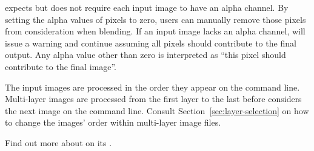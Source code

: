 \App{} expects but does not require each input image to have an alpha
channel.
By setting the alpha values of pixels to zero, users can manually
remove those pixels from consideration when blending.  If an input
image lacks an alpha channel, \App{} will issue a warning and continue
assuming all pixels should contribute to the final output.  Any alpha
value other than zero is interpreted as ``this pixel should contribute
to the final image''.

The input images are processed in the order they appear on the command
line.  Multi\hyp{}layer images are processed from the first layer to
the last before \App{} considers the next image on the command line.
Consult Section~\ref{sec:layer-selection} on how to change the images'
order within multi\hyp{}layer image files.

Find out more about \App{} on its
.

